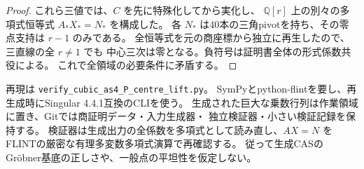 \begin{proof}
これら三値では、$C$ を先に特殊化してから実化し、
$\mathbb Q[r]$ 上の別々の多項式恒等式 $A_*X_*=N_*$ を構成した。
各 $N_*$ は40本の三角pivotを持ち、その零点支持は $r-1$ のみである。
全恒等式を元の商座標から独立に再生したので、三直線の全 $r\ne1$ でも
中心三次は零となる。負符号は証明書全体の形式係数共役による。
これで全領域の必要条件に矛盾する。
\end{proof}

再現は
\texttt{verify\_\allowbreak{}cubic\_\allowbreak{}as4\_\allowbreak{}P\_\allowbreak{}centre\_\allowbreak{}lift.py}。
SymPyとpython-flintを要し、再生成時にSingular 4.4.1互換のCLIを使う。
生成された巨大な乗数行列は作業領域に置き、Gitでは商証明データ・入力生成器・
独立検証器・小さい検証記録を保持する。
検証器は生成出力の全係数を多項式として読み直し、$AX=N$ を
FLINTの厳密な有理多変数多項式演算で再確認する。
従って生成CASのGr\"obner基底の正しさや、一般点の平坦性を仮定しない。
